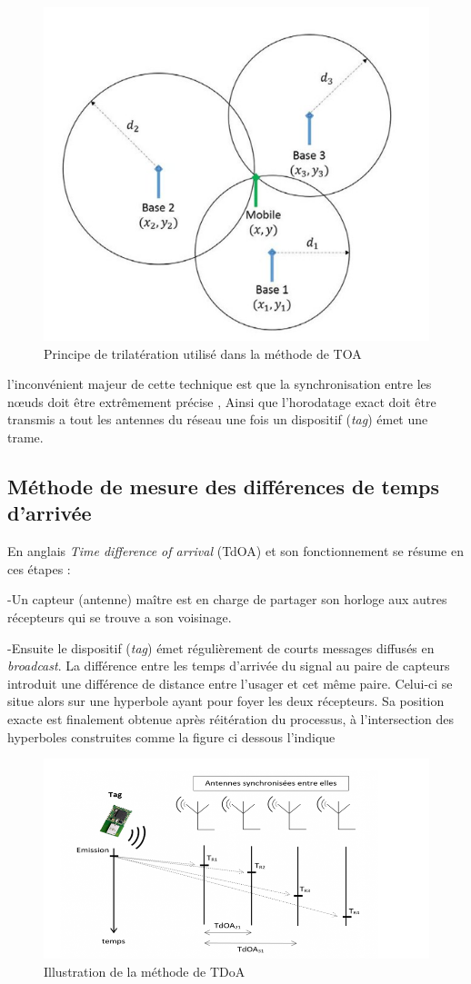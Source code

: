 \documentclass[12pt,a4paper]{report}
\begin{document}
\begin{figure}[H]
	\centering
	\includegraphics[width=0.6\linewidth]{Pics/trilateration.PNG}
	\caption{Principe de trilatération utilisé dans la méthode de TOA}
	\label{fig:trilateration}
	

\end{figure}

l'inconvénient majeur de cette technique est que la synchronisation entre les nœuds doit être extrêmement précise , Ainsi que l'horodatage exact doit être transmis a tout les antennes du réseau une fois un dispositif (\textit{tag}) émet une trame.
\subsection{Méthode de mesure des différences de temps d’arrivée}

En anglais \textit{Time difference of arrival} (TdOA) et son fonctionnement se résume en ces étapes : 

-Un capteur (antenne) maître est en charge de partager son horloge aux autres récepteurs qui se trouve a son voisinage.

-Ensuite le dispositif (\textit{tag}) émet régulièrement de courts messages diffusés en \textit{broadcast}.
 La différence entre les temps d’arrivée du signal au paire de capteurs introduit une différence de distance entre l’usager et cet même paire.
 Celui-ci se situe alors sur une hyperbole ayant pour foyer les deux récepteurs. Sa position exacte est finalement obtenue après réitération du processus, à l’intersection des hyperboles construites comme la figure ci dessous l'indique
  
\begin{figure}[H]
	\centering
	\includegraphics[width=1.1\linewidth]{Pics/tdoa.PNG}
	\caption{Illustration de la méthode de TDoA}
	\label{fig:tdoa}
	
	
\end{figure}
\end{document}
